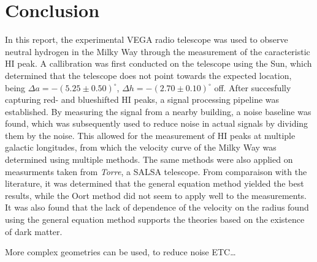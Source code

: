 \section{Conclusion}

In this report, the experimental VEGA radio telescope was used to observe neutral hydrogen in the Milky Way through the measurement of the caracteristic HI peak. A callibration was first conducted on the telescope using the Sun, which determined that the telescope does not point towards the expected location, being $\Delta a = -(5.25 \pm 0.50)^\circ$, $\Delta h = -(2.70 \pm 0.10)^\circ$ off. After succesfully capturing red- and blueshifted HI peaks, a signal processing pipeline was established. By measuring the signal from a nearby building, a noise baseline was found, which was subsequently used to reduce noise in actual signals by dividing them by the noise. This allowed for the measurement of HI peaks at multiple galactic longitudes, from which the velocity curve of the Milky Way was determined using multiple methods. The same methods were also applied on measurments taken from \emph{Torre}, a SALSA telescope. From comparaison with the literature, it was determined that the general equation method yielded the best results, while the Oort method did not seem to apply well to the measurements. It was also found that the lack of dependence of the velocity on the radius found using the general equation method supports the theories based on the existence of dark matter.   

More complex geometries can be used, to reduce noise ETC\ldots \cite{burke_introduction_2013}